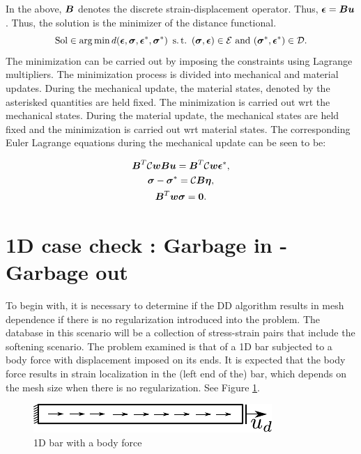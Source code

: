 \documentclass[11pt]{elsarticle}
\begin{document}
In the above, $\mbox{\boldmath $B$}$ denotes the discrete strain-displacement operator. Thus, $\mbox{\boldmath $\epsilon$} = \mbox{\boldmath $B$} \mbox{\boldmath $u$}$. Thus, the solution is the minimizer of the distance functional.
\begin{equation}
	\text{Sol} \in \arg \min d(\mbox{\boldmath $\epsilon$},\mbox{\boldmath $\sigma$},\mbox{\boldmath $\epsilon$}^*,\mbox{\boldmath $\sigma$}^*) \text{ } \operatorname{s.t.} \text{ } (\mbox{\boldmath $\sigma$} , \mbox{\boldmath $\epsilon$}) \in  \mathcal{E} \text{ and } (\mbox{\boldmath $\sigma$}^* , \mbox{\boldmath $\epsilon$}^*) \in  \mathcal{D}.
\end{equation}
The minimization can be carried out by imposing the constraints using Lagrange multipliers. The minimization process is divided into mechanical and material updates. During the mechanical update, the material states, denoted by the asterisked quantities are held fixed. The minimization is carried out wrt the mechanical states. During the material update, the mechanical states are held fixed and the minimization is carried out wrt material states.
The corresponding Euler Lagrange equations during the mechanical update can be seen to be:

\begin{gather}
	\mbox{\boldmath $B$}^T \mathcal{C}\mbox{\boldmath $w$} \mbox{\boldmath $B$} \mbox{\boldmath $u$} = \mbox{\boldmath $B$}^T \mathcal{C}\mbox{\boldmath $w$} \mbox{\boldmath $\epsilon$}^*, \\
	\mbox{\boldmath $\sigma$} - \mbox{\boldmath $\sigma$}^* =  \mathcal{C} \mbox{\boldmath $B$} \mbox{\boldmath $\eta$}, \\
	\mbox{\boldmath $B$}^T \mbox{\boldmath $w$}\mbox{\boldmath $\sigma$} = \mathbf{0}.
\end{gather}

\section{1D case check : Garbage in - Garbage out}
To begin with, it is necessary to determine if the DD algorithm results in mesh dependence if there is no regularization introduced into the problem. The database in this scenario will be a collection of stress-strain pairs that include the softening scenario. The problem examined is that of a 1D bar subjected to a body force with displacement imposed on its ends. It is expected that the body force results in strain localization in the (left end of the) bar, which depends on the mesh size when there is no regularization. See Figure \ref{1D_bar_bf}.

\begin{figure}
	\centering
	\includegraphics[width=0.5\linewidth]{Images/1D_bar_bf.pdf}
	\caption{1D bar with a body force \label{1D_bar_bf}}
\end{figure}
\end{document}
